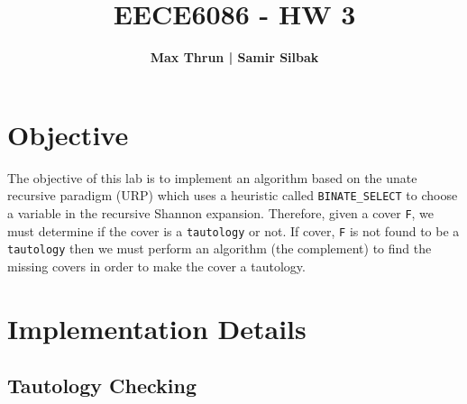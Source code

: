 \documentclass[10pt]{article}
\title{
    \vspace{2in}
    \textmd{\textbf{EECE6086 - HW 3}}\\
    \vspace{4in}
}
\author{\textbf{Max Thrun | Samir Silbak}}
\begin{document}
\maketitle
\newpage
\section{Objective}
The objective of this lab is to implement an algorithm based on the unate
recursive paradigm (URP) which uses a heuristic called \texttt{BINATE\_SELECT}
to choose a variable in the recursive Shannon expansion. Therefore, given a
cover \texttt{F}, we must determine if the cover is a \texttt{tautology} or
not. If cover, \texttt{F} is not found to be a \texttt{tautology} then we must
perform an algorithm (the complement) to find the missing covers in order to
make the cover a tautology.

\section{Implementation Details}

    \subsection{Tautology Checking}
\end{document}
